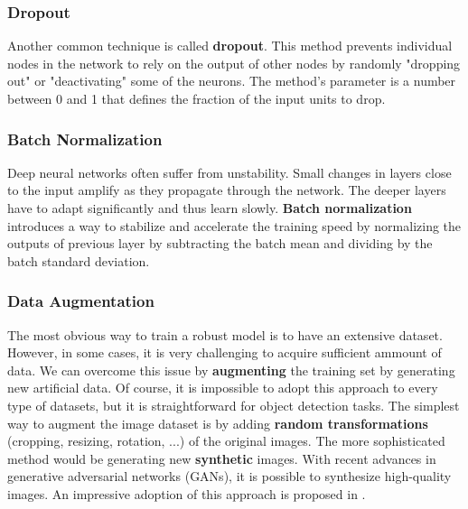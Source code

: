 \subsubsection{Dropout}
Another common technique is called \textbf{dropout}. This method prevents
individual nodes in the network to rely on the output of other nodes by randomly
"dropping out" or "deactivating" some of the neurons. The method's parameter is
a number between 0 and 1 that defines the fraction of the input units to drop.

\subsubsection{Batch Normalization}
Deep neural networks often suffer from unstability. Small changes in layers
close to the input amplify as they propagate through the network. The deeper
layers have to adapt significantly and thus learn slowly.
\textbf{Batch normalization} introduces a way to stabilize and accelerate the
training speed by normalizing the outputs of previous layer by subtracting the
batch mean and dividing by the batch standard deviation.

\subsubsection{Data Augmentation}
The most obvious way to train a robust model is to have an extensive dataset.
However, in some cases, it is very challenging to acquire sufficient ammount of
data. We can overcome this issue by
\textbf{augmenting} the training set by generating new artificial data. Of
course, it is impossible to adopt this approach to every type of datasets, but
it is straightforward for object detection tasks. The simplest way to augment
the image dataset is by adding \textbf{random transformations} (cropping,
resizing, rotation, ...) of the original images. The more sophisticated method
would be generating new \textbf{synthetic} images. With recent advances in
generative adversarial networks (GANs), it is possible to synthesize
high-quality images. An impressive adoption of this approach is proposed in
\cite{wei2019generative}.













